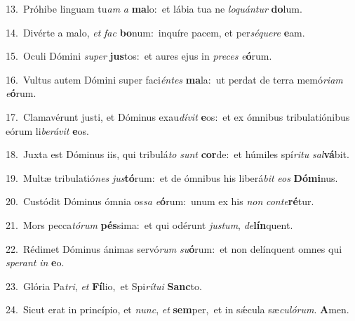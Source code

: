 {\numbfont\textcolor{\numbcolor}{13.}}~Próhibe linguam tu\textit{am} \textit{a} \textbf{ma}\-lo:~\star et lábia tua ne \textit{lo}\-\textit{quán}\textit{tur} \textbf{do}\-lum.\par
{\numbfont\textcolor{\numbcolor}{14.}}~Divérte a malo, \textit{et} \textit{fac} \textbf{bo}\-num:~\star inquíre pacem, et per\-\textit{sé}\-\textit{que}\textit{re} \textbf{e}\-am.\par
{\numbfont\textcolor{\numbcolor}{15.}}~Oculi Dómini \textit{su}\-\textit{per} \textbf{jus}\-tos:~\star et aures ejus in \textit{pre}\-\textit{ces} \textit{e}\-\textbf{ó}rum.\par
{\numbfont\textcolor{\numbcolor}{16.}}~Vultus autem Dómini super faci\-\textit{én}\-\textit{tes} \textbf{ma}\-la:~\star ut perdat de terra memó\-\textit{ri}\-\textit{am} \textit{e}\-\textbf{ó}rum.\par
{\numbfont\textcolor{\numbcolor}{17.}}~Clamavérunt justi, et Dóminus exau\-\textit{dí}\-\textit{vit} \textbf{e}\-os:~\star et ex ómnibus tribulatiónibus eórum li\-\textit{be}\-\textit{rá}\textit{vit} \textbf{e}\-os.\par
{\numbfont\textcolor{\numbcolor}{18.}}~Juxta est Dóminus iis, qui tribulá\textit{to} \textit{sunt} \textbf{cor}\-de:~\star et húmiles spí\-\textit{ri}\-\textit{tu} \textit{sal}\-\textbf{vá}bit.\par
{\numbfont\textcolor{\numbcolor}{19.}}~Multæ tribulatió\textit{nes} \textit{jus}\-\textbf{tó}rum:~\star et de ómnibus his liberá\textit{bit} \textit{e}\-\textit{os} \textbf{Dó}\-\textbf{mi}nus.\par
{\numbfont\textcolor{\numbcolor}{20.}}~Custódit Dóminus ómnia os\textit{sa} \textit{e}\-\textbf{ó}rum:~\star unum ex his \textit{non} \textit{con}\-\textit{te}\textbf{ré}tur.\par
{\numbfont\textcolor{\numbcolor}{21.}}~Mors pecca\-\textit{tó}\-\textit{rum} \textbf{pés}\-sima:~\star et qui odérunt \textit{jus}\-\textit{tum}, \textit{de}\-\textbf{lín}quent.\par
{\numbfont\textcolor{\numbcolor}{22.}}~Rédimet Dóminus ánimas servó\textit{rum} \textit{su}\-\textbf{ó}rum:~\star et non delínquent omnes qui \textit{spe}\-\textit{rant} \textit{in} \textbf{e}\-o.\par
{\numbfont\textcolor{\numbcolor}{23.}}~Glória Pa\-\textit{tri}\-, \textit{et} \textbf{Fí}\-lio,~\star et Spi\-\textit{rí}\-\textit{tu}\textit{i} \textbf{Sanc}\-to.\par
{\numbfont\textcolor{\numbcolor}{24.}}~Sicut erat in princípio, et \textit{nunc}\-, \textit{et} \textbf{sem}\-per,~\star et in sǽcula sæ\-\textit{cu}\-\textit{ló}\textit{rum}. \textbf{A}\-men.\par
